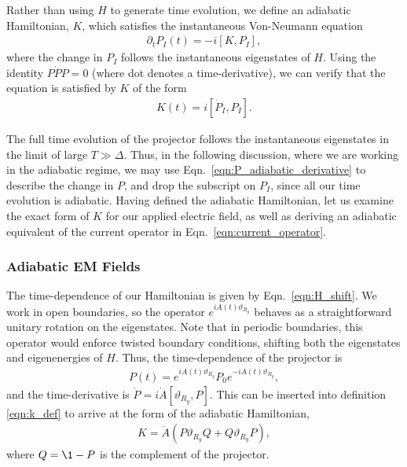 Rather than using $H$ to generate time evolution, we define an adiabatic Hamiltonian, $K$, which satisfies the instantaneous Von-Neumann equation
\begin{align}\label{eqn:P_adiabatic_derivative}
    \partial_t P_I(t) = -i[K, P_I],
\end{align}
where the change in $P_I$ follows the instantaneous eigenstates of $H$. Using the identity $P \dot P P = 0$ (where dot denotes a time-derivative), we can verify that the equation is satisfied by $K$ of the form
\begin{align}\label{eqn:k_def}
    K(t) = i[\dot P_I , P_I].
\end{align}

The full time evolution of the projector follows the instantaneous eigenstates in the limit of large $T \gg \Delta$. Thus, in the following discussion, where we are working in the adiabatic regime, we may use Eqn.~\ref{eqn:P_adiabatic_derivative} to describe the change in $P$, and drop the subscript on $P_I$, since all our time evolution is adiabatic. Having defined the adiabatic Hamiltonian, let us examine the exact form of $K$ for our applied electric field, as well as deriving an adiabatic equivalent of the current operator in Eqn.~\ref{eqn:current_operator}.

\subsubsection{Adiabatic EM Fields}\label{sec:kato_field}

The time-dependence of our Hamiltonian is given by Eqn.~\ref{eqn:H_shift}. We work in open boundaries, so the operator $e^{i A(t) \vartheta_{R_y}}$ behaves as a straightforward unitary rotation on the eigenstates. Note that in periodic boundaries, this operator would enforce twisted boundary conditions, shifting both the eigenstates and eigenenergies of $H$. Thus, the time-dependence of the projector is
\begin{align}
    P(t) = e^{i A(t) \vartheta_{R_y}} P_0 e^{-i A(t) \vartheta_{R_y}},
\end{align}
and the time-derivative is $\dot P =  i \dot A \left [ \vartheta_{R_y} , P \right ]$. This can be inserted into definition \ref{eqn:k_def} to arrive at the form of the adiabatic Hamiltonian,
\begin{align}\label{eqn:exact_k}
    K = \dot A \left ( P\vartheta_{R_y} Q +
    Q\vartheta_{R_y} P \right ),
\end{align}
where $Q = \1-P$ is the complement of the projector.

